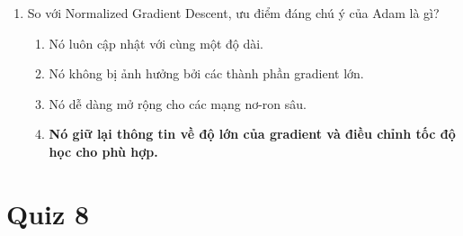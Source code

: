 \documentclass{book}
\begin{document}
\begin{enumerate}
    \item So với Normalized Gradient Descent, ưu điểm đáng chú ý của Adam là gì?
    \begin{multicols}{2}
        \begin{enumerate}[label=\Alph*]
            \item Nó luôn cập nhật với cùng một độ dài.
            \item Nó không bị ảnh hưởng bởi các thành phần gradient lớn.
            \item Nó dễ dàng mở rộng cho các mạng nơ-ron sâu.
            \item \textbf{Nó giữ lại thông tin về độ lớn của gradient và điều chỉnh tốc độ học cho phù hợp.}
        \end{enumerate}
    \end{multicols}

\end{enumerate}
\section{Quiz 8}
\end{document}
